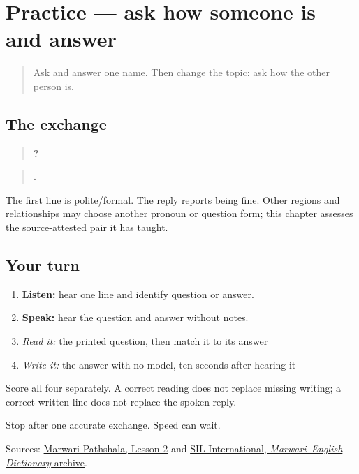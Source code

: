 \section[Practice]{Practice — ask how someone is and answer}

\label{lesson:MW-C06-practice}



\begin{quote}
Ask and answer one name. Then change the topic: ask how the other person is.
\end{quote}

\subsection*{The exchange}
\begin{quote}
\textbf{  ?}
\end{quote}

\begin{quote}
\textbf{  .}
\end{quote}

The first line is polite/formal. The reply reports being fine. Other regions and relationships may choose another pronoun or question form; this chapter assesses the source-attested pair it has taught.

\subsection*{Your turn}
\begin{enumerate}
\raggedright
  \item \textbf{Listen:} hear one line and identify question or answer.
  \item \textbf{Speak:} hear the question and answer without notes.
  \item \emph{Read it:} the printed question, then match it to its answer
  \item \emph{Write it:} the answer with no model, ten seconds after hearing it
\end{enumerate}

Score all four separately. A correct reading does not replace missing writing; a correct written line does not replace the spoken reply.

\begin{tcolorbox}[breakable,colback=teal!4,colframe=teal!35!black,title={Before you move on}]
Stop after one accurate exchange. Speed can wait.

Sources: \href{https://www.marwaripathshala.com/marwari-lesson-2-english}{Marwari Pathshala, Lesson 2} and \href{https://nepal.sil.org/resources/archives/63768}{SIL International, \emph{Marwari–English Dictionary} archive}.
\end{tcolorbox}
